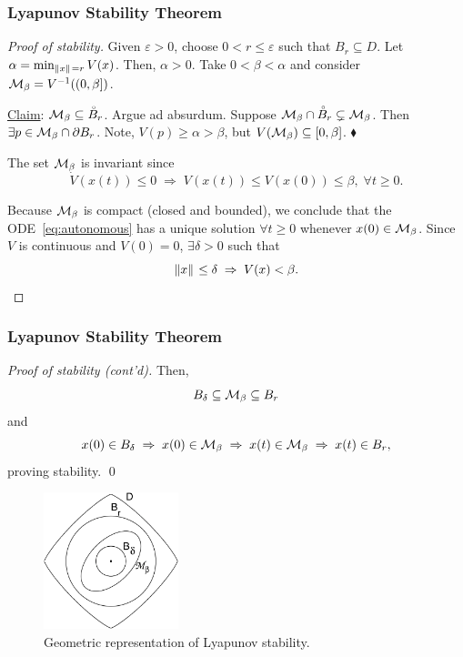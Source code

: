 \begin{frame}
    \frametitle{Lyapunov Stability Theorem}

    \begin{proof}[Proof of stability]
        Given $\varepsilon > 0$, choose $0 < r \leq \varepsilon$ such that $B_r
        \subseteq D$. Let $\alpha = \min_{\|{x}\|_{{}_{}}=r} V(x)$. Then, $\alpha >
        0$. Take $0 < \beta < \alpha$ and consider $\mathcal{M}_\beta = V^{-1}((0,
        \beta])$.

        \underline{Claim}: $\mathcal{M}_\beta \subseteq \accentset{\circ}{B}_r$.
        Argue ad absurdum. Suppose $\mathcal{M}_\beta \cap \accentset{\circ}{B}_r
        \subsetneq \mathcal{M}_\beta$. Then $\exists p \in \mathcal{M}_\beta \cap \partial B_r$.
        Note, $V(p) \geq \alpha > \beta$, but $V(\mathcal{M}_\beta) \subseteq
        [0,\beta]$. \hfill $\blacklozenge$

        The set $\mathcal{M}_\beta$ is invariant since \[ \dot{V}(x(t)) \leq 0 \;
        \Rightarrow \; V(x(t)) \leq V(x(0)) \leq \beta, \; \forall t \geq 0. \]

        Because $\mathcal{M}_\beta$ is compact (closed and bounded), we conclude that
        the ODE~\eqref{eq:autonomous} has a unique solution $\forall t \geq 0$
        whenever $x(0) \in \mathcal{M}_\beta$. Since $V$ is continuous and $V(0) =
        0$, $\exists \delta > 0$ such that \[ \|{x}\|_{{}_{}} \leq \delta \;
        \Rightarrow \; V(x) < \beta. \]
    \end{proof}
\end{frame}

\begin{frame}
    \frametitle{Lyapunov Stability Theorem}

    \begin{proof}[Proof of stability (cont'd)]
        Then, \[ B_\delta \subseteq \mathcal{M}_\beta \subseteq B_r \] and 
        \[ x(0) \in B_\delta \; \Rightarrow \; x(0) \in \mathcal{M}_\beta \;
        \Rightarrow \; x(t) \in \mathcal{M}_\beta \; \Rightarrow \; x(t) \in B_r, \]
        proving stability. \hfill \qed
    \end{proof}

    \begin{figure}[bth]
        \centering
        \includegraphics[width=0.35\textwidth]{figures/lyap_geometry.eps} 
        \caption{\footnotesize Geometric representation of Lyapunov stability.}
    \end{figure}
\end{frame}

